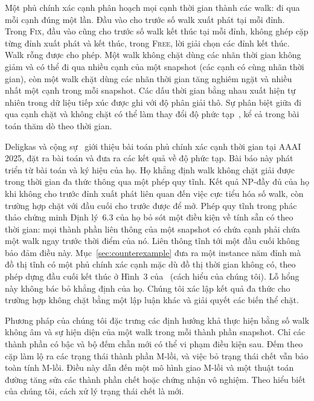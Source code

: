 \documentclass[pdflatex,sn-mathphys-num]{sn-jnl}
\theoremstyle{thmstyleone}
\theoremstyle{thmstyletwo}
\theoremstyle{thmstylethree}
\newcommand{\FIX}{\textup{\textsc{Fix}}}
\newcommand{\FREE}{\textup{\textsc{Free}}}
\begin{document}
Một phủ chính xác cạnh phân hoạch mọi cạnh thời gian thành các walk: đi qua mỗi cạnh đúng một lần. Đầu vào cho trước số walk xuất phát tại mỗi đỉnh. Trong \FIX{}, đầu vào cũng cho trước số walk kết thúc tại mỗi đỉnh, không ghép cặp từng đỉnh xuất phát và kết thúc, trong \FREE{}, lời giải chọn các đỉnh kết thúc. Walk rỗng được cho phép. Một walk không chặt dùng các nhãn thời gian không giảm và có thể đi qua nhiều cạnh của một snapshot (các cạnh có cùng nhãn thời gian), còn một walk chặt dùng các nhãn thời gian tăng nghiêm ngặt và nhiều nhất một cạnh trong mỗi snapshot. Các dấu thời gian bằng nhau xuất hiện tự nhiên trong dữ liệu tiếp xúc được ghi với độ phân giải thô. Sự phân biệt giữa đi qua cạnh chặt và không chặt có thể làm thay đổi độ phức tạp~\cite{casteigts2024,erlebach2023}, kể cả trong bài toán thăm dò theo thời gian. 

Deligkas và cộng sự~\cite{deligkas2025} giới thiệu bài toán phủ chính xác cạnh thời gian tại AAAI 2025, đặt ra bài toán và đưa ra các kết quả về độ phức tạp. Bài báo này phát triển từ bài toán và ký hiệu của họ. Họ khẳng định walk không chặt giải được trong thời gian đa thức thông qua một phép quy tĩnh. Kết quả NP-đầy đủ của họ khi không cho trước đỉnh xuất phát liên quan đến việc cực tiểu hóa số walk, còn trường hợp chặt với đầu cuối cho trước được để mở. Phép quy tĩnh trong phác thảo chứng minh Định lý~6.3 của họ bỏ sót một điều kiện về tính sẵn có theo thời gian: mọi thành phần liên thông của một snapshot có chứa cạnh phải chứa một walk ngay trước thời điểm của nó. Liên thông tĩnh tới một đầu cuối không bảo đảm điều này. Mục~\ref{sec:counterexample} đưa ra một instance năm đỉnh mà đồ thị tĩnh có một phủ chính xác cạnh mặc dù đồ thị thời gian không có, theo phép dựng đầu cuối kết thúc ở Hình~3 của~\cite{deligkas2025} (cách hiểu của chúng tôi). Lỗ hổng này không bác bỏ khẳng định của họ. Chúng tôi xác lập kết quả đa thức cho trường hợp không chặt bằng một lập luận khác và giải quyết các biến thể chặt.

Phương pháp của chúng tôi đặc trưng các định hướng khả thực hiện bằng số walk không âm và sự hiện diện của một walk trong mỗi thành phần snapshot. Chỉ các thành phần có bậc và bộ đếm chẵn mới có thể vi phạm điều kiện sau. Đếm theo cặp làm lộ ra các trạng thái thành phần M-lồi, và việc bỏ trạng thái chết vẫn bảo toàn tính M-lồi. Điều này dẫn đến một mô hình giao M-lồi và một thuật toán đường tăng sửa các thành phần chết hoặc chứng nhận vô nghiệm. Theo hiểu biết của chúng tôi, cách xử lý trạng thái chết là mới.
\end{document}
